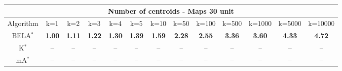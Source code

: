 \begin{tabular}{c|cccccccccccc}\toprule
\multicolumn{13}{c}{Number of centroids - Maps 30 unit}\\ \midrule
Algorithm & k=1 & k=2 & k=3 & k=4 & k=5 & k=10 & k=50 & k=100 & k=500 & k=1000 & k=5000 & k=10000 \\ \midrule
BELA$^*$ & \textbf{1.00} & \textbf{1.11} & \textbf{1.22} & \textbf{1.30} & \textbf{1.39} & \textbf{1.59} & \textbf{2.28} & \textbf{2.55} & \textbf{3.36} & \textbf{3.60} & \textbf{4.33} & \textbf{4.72} \\
K$^*$ & -- & -- & -- & -- & -- & -- & -- & -- & -- & -- & -- & -- \\
mA$^*$ & -- & -- & -- & -- & -- & -- & -- & -- & -- & -- & -- & -- \\ \bottomrule 
\end{tabular}
